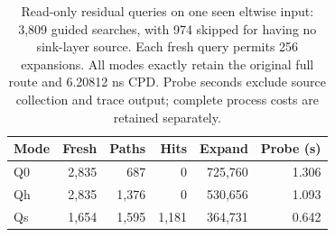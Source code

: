 \begin{table}[t]
\centering
\caption{Read-only residual queries on one seen eltwise input: 3,809 guided searches, with 974 skipped for having no sink-layer source. Each fresh query permits 256 expansions. All modes exactly retain the original full route and 6.20812 ns CPD. Probe seconds exclude source collection and trace output; complete process costs are retained separately.}
\label{tab:residual-query}
\scriptsize
\begin{tabular}{lrrrrr}
\hline
Mode & Fresh & Paths & Hits & Expand & Probe (s) \\
\hline
Q0 & 2,835 & 687 & 0 & 725,760 & 1.306 \\
Qh & 2,835 & 1,376 & 0 & 530,656 & 1.093 \\
Qs & 1,654 & 1,595 & 1,181 & 364,731 & 0.642 \\
\hline
\end{tabular}
\end{table}
